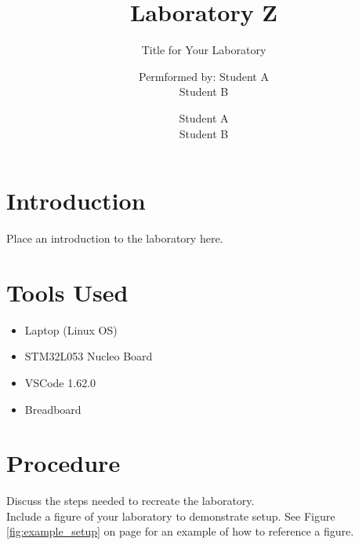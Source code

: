 
\author{Permformed by: Student A\\Student B}
\title{Laboratory Z}
\subtitle{Title for Your Laboratory}
\subject{EGR 227-xx\\Semester X\\Prof. Y}
\author{Student A\\Student B}


 
\maketitle
\section{Introduction}
Place an introduction to the laboratory here.

\section{Tools Used}
\begin{itemize}
\item Laptop (Linux OS)
\item STM32L053 Nucleo Board
\item VSCode 1.62.0
\item Breadboard
\end{itemize}

\section{Procedure}
Discuss the steps needed to recreate the laboratory.\\

Include a figure of your laboratory to demonstrate setup.  See Figure \ref{fig:example_setup} on page \pageref{fig:example_setup} for an example of how to reference a figure.

